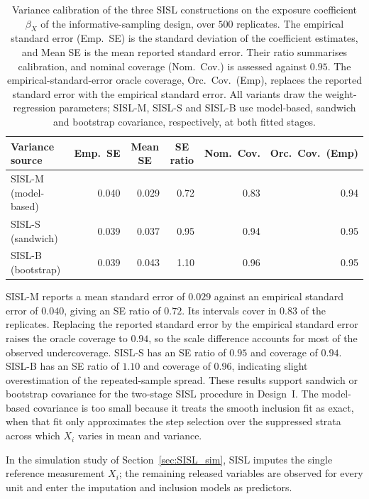 \begin{table}[!htbp]\centering
\caption{Variance calibration of the three SISL constructions on the exposure coefficient $\beta_X$ of the informative-sampling design, over $500$ replicates. The empirical standard error (Emp.\ SE) is the standard deviation of the coefficient estimates, and Mean SE is the mean reported standard error. Their ratio summarises calibration, and nominal coverage (Nom.\ Cov.) is assessed against $0.95$. The empirical-standard-error oracle coverage, Orc.\ Cov.\ (Emp), replaces the reported standard error with the empirical standard error. All variants draw the weight-regression parameters; SISL-M, SISL-S and SISL-B use model-based, sandwich and bootstrap covariance, respectively, at both fitted stages.}
\label{tab:sisl_variance}
\small
\begin{tabular}{lrrrrr}
\toprule
Variance source & \multicolumn{1}{c}{Emp.\ SE} & \multicolumn{1}{c}{Mean SE} & \multicolumn{1}{c}{SE ratio} & \multicolumn{1}{c}{Nom.\ Cov.} & \multicolumn{1}{c}{Orc.\ Cov.\ (Emp)} \\
\midrule
SISL-M (model-based) & 0.040 & 0.029 & 0.72 & 0.83 & 0.94 \\
SISL-S (sandwich) & 0.039 & 0.037 & 0.95 & 0.94 & 0.95 \\
SISL-B (bootstrap) & 0.039 & 0.043 & 1.10 & 0.96 & 0.95 \\
\bottomrule
\end{tabular}
\end{table}

SISL-M reports a mean standard error of $0.029$ against an empirical standard error of $0.040$, giving an SE ratio of $0.72$. Its intervals cover in $0.83$ of the replicates. Replacing the reported standard error by the empirical standard error raises the oracle coverage to $0.94$, so the scale difference accounts for most of the observed undercoverage. SISL-S has an SE ratio of $0.95$ and coverage of $0.94$. SISL-B has an SE ratio of $1.10$ and coverage of $0.96$, indicating slight overestimation of the repeated-sample spread. These results support sandwich or bootstrap covariance for the two-stage SISL procedure in Design~I. The model-based covariance is too small because it treats the smooth inclusion fit as exact, when that fit only approximates the step selection over the suppressed strata across which $X_i$ varies in mean and variance.

In the simulation study of Section~\ref{sec:SISL_sim}, SISL imputes the single reference measurement $X_i$; the remaining released variables are observed for every unit and enter the imputation and inclusion models as predictors.
 
